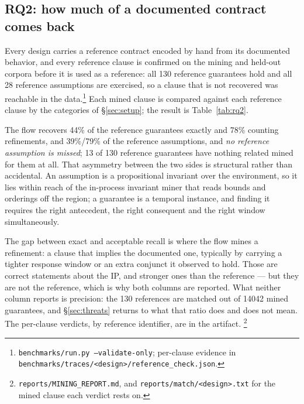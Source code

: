 \subsection{RQ2: how much of a documented contract comes back}
\label{sec:rq2}
Every design carries a reference contract encoded by hand from its documented behavior, and
every reference clause is confirmed on the mining and held-out corpora before it is used as a
reference: all 130 reference guarantees hold and all 28 reference assumptions are exercised,
so a clause that is not recovered was reachable in the data.\footnote{\texttt{benchmarks/run.py
--validate-only}; per-clause evidence in \texttt{benchmarks/traces/<design>/reference\_check.json}.}
Each mined clause is compared against each reference clause by the categories of
\S\ref{sec:setup}; the result is Table~\ref{tab:rq2}.

The flow recovers 44\% of the reference guarantees exactly and 78\% counting refinements,
and 39\%/79\% of the reference assumptions, and \emph{no reference assumption is missed};
13 of 130 reference guarantees have nothing related mined for them at all. That asymmetry
between the two sides is structural rather than accidental. An assumption is a propositional invariant over the environment, so it lies
within reach of the in-process invariant miner that reads bounds and orderings off the
region; a guarantee is a temporal instance, and finding it requires the right antecedent, the
right consequent and the right window simultaneously.

The gap between exact and acceptable recall is where the flow mines a refinement: a clause
that implies the documented one, typically by carrying a tighter response window or an extra
conjunct it observed to hold. Those are correct statements about the IP, and stronger ones
than the reference --- but they are not the reference, which is why both columns are
reported. What neither column reports is precision: the 130 references are matched out of
14042 mined guarantees, and \S\ref{sec:threats} returns to what that ratio does and does not
mean. The per-clause verdicts, by reference identifier, are in the artifact.%
\footnote{\texttt{reports/MINING\_REPORT.md}, and \texttt{reports/match/<design>.txt} for the
mined clause each verdict rests on.}


